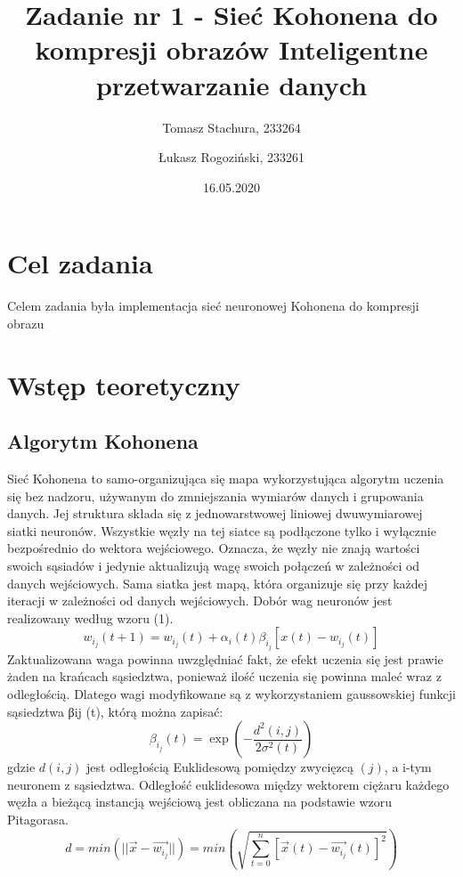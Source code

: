 \documentclass[12pt]{article}
\title{{\bf Zadanie nr 1 -  Sieć Kohonena do kompresji obrazów}\linebreak
Inteligentne przetwarzanie danych}
\author{Tomasz Stachura, 233264 \and Łukasz Rogoziński, 233261}
\date{16.05.2020}
\begin{document}
\clearpage\maketitle
\thispagestyle{empty}
\newpage
\setcounter{page}{1}
\section{Cel zadania}
Celem zadania była implementacja sieć neuronowej Kohonena do kompresji obrazu

\section{Wstęp teoretyczny}

\subsection{Algorytm Kohonena}
 Sieć Kohonena to samo-organizująca się mapa wykorzystująca  algorytm uczenia się bez nadzoru, używanym do zmniejszania wymiarów danych i grupowania danych. Jej struktura składa się z jednowarstwowej liniowej dwuwymiarowej siatki neuronów. Wszystkie węzły na tej siatce są podłączone tylko i wyłącznie bezpośrednio do wektora wejściowego. Oznacza, że węzły nie znają wartości swoich sąsiadów i jedynie aktualizują wagę swoich połączeń w zależności od danych wejściowych. Sama siatka jest mapą, która organizuje się przy każdej iteracji w zależności od danych wejściowych. Dobór wag neuronów jest realizowany według wzoru (1).
\begin{equation}
    w_i_j(t+1)= w_i_j(t)+\alpha_i(t)\beta_i_j[x(t)-w_i_j(t)]
\end{equation}
 Zaktualizowana waga powinna uwzględniać fakt, że efekt uczenia się jest prawie żaden na krańcach sąsiedztwa, ponieważ ilość uczenia się powinna maleć wraz z odległością. Dlatego wagi modyfikowane są z wykorzystaniem gaussowskiej funkcji sąsiedztwa βij (t), którą można zapisać:
\begin{equation}
\beta_i_j(t)=\exp\left(-\frac{d^2(i,j)}{2\sigma^2(t)}\right)
\end{equation}
gdzie $d(i,j)$ jest odległością Euklidesową pomiędzy zwycięzcą $(j)$, a i-tym
neuronem z sąsiedztwa. Odległość euklidesowa między wektorem ciężaru każdego węzła a bieżącą instancją wejściową jest obliczana na podstawie wzoru Pitagorasa.
\begin{equation}
d = min( || \overrightarrow{x} - \overrightarrow{w_i_j} || ) =min \left(\sqrt{\sum_{t=0}^{n}[\overrightarrow{x}(t) - \overrightarrow{w_i_j}(t)]^{2}}\right)
\end{equation}
\end{document}
